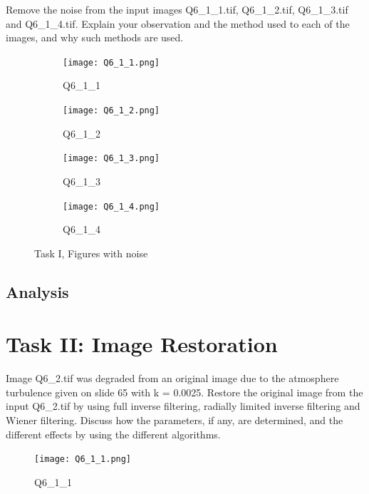 \documentclass[
	12pt, %
]{style/fphw}
\begin{document}
\begin{problem}
	Remove the noise from the input images Q6\_1\_1.tif, Q6\_1\_2.tif, Q6\_1\_3.tif and Q6\_1\_4.tif. Explain your observation and the method used to each of the images, and why such methods are used.

	\begin{figure}[H]
		\centering
		\begin{subfigure}[b]{.2\textwidth}
			\centering
			\texttt{[image: Q6\_1\_1.png]}
			\caption{Q6\_1\_1}
			\label{Q6_1_1}
		\end{subfigure}
		\hfill
		\begin{subfigure}[b]{.2\textwidth}
			\centering
			\texttt{[image: Q6\_1\_2.png]}
			\caption{Q6\_1\_2}
			\label{Q6_1_2}
		\end{subfigure}
		\hfill
		\begin{subfigure}[b]{.2\textwidth}
			\centering
			\texttt{[image: Q6\_1\_3.png]}
			\caption{Q6\_1\_3}
			\label{Q6_1_3}
		\end{subfigure}
		\hfill
		\begin{subfigure}[b]{.2\textwidth}
			\centering
			\texttt{[image: Q6\_1\_4.png]}
			\caption{Q6\_1\_4}
			\label{Q6_1_4}
		\end{subfigure}
		\caption{Task I, Figures with noise}
    	\label{Task I, Figures with noise}	
	\end{figure}
\end{problem}

\subsection*{Analysis}




\section*{Task II: Image Restoration}

\begin{problem}
	Image Q6\_2.tif was degraded from an original image due to the atmosphere turbulence given on slide 65 with k = 0.0025. Restore the original image from the input Q6\_2.tif by using full inverse filtering, radially limited inverse filtering and Wiener filtering. Discuss how the parameters, if any, are determined, and the different effects by using the different algorithms.

	\begin{figure}[H]
		\centering
	    \texttt{[image: Q6\_1\_1.png]}
	    \caption{Q6\_1\_1}
	    \label{Q6_1_1}
	\end{figure}
\end{problem}
\end{document}
